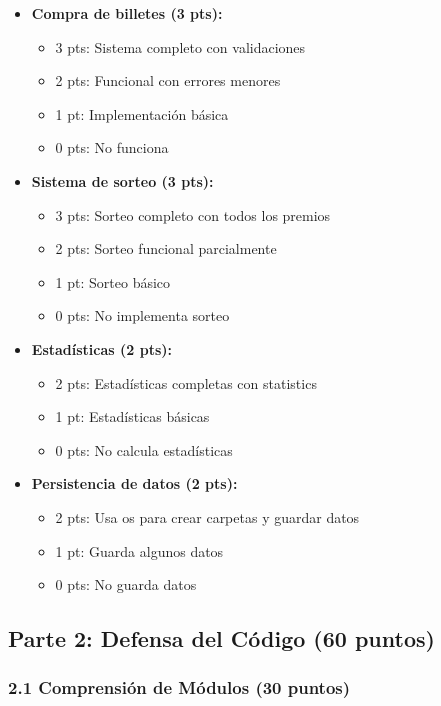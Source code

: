 \documentclass[12pt,a4paper]{article}
\begin{document}
\begin{itemize}[leftmargin=*]
    \item \textbf{Compra de billetes (3 pts):}
    \begin{itemize}
        \item 3 pts: Sistema completo con validaciones
        \item 2 pts: Funcional con errores menores
        \item 1 pt: Implementación básica
        \item 0 pts: No funciona
    \end{itemize}
    
    \item \textbf{Sistema de sorteo (3 pts):}
    \begin{itemize}
        \item 3 pts: Sorteo completo con todos los premios
        \item 2 pts: Sorteo funcional parcialmente
        \item 1 pt: Sorteo básico
        \item 0 pts: No implementa sorteo
    \end{itemize}
    
    \item \textbf{Estadísticas (2 pts):}
    \begin{itemize}
        \item 2 pts: Estadísticas completas con statistics
        \item 1 pt: Estadísticas básicas
        \item 0 pts: No calcula estadísticas
    \end{itemize}
    
    \item \textbf{Persistencia de datos (2 pts):}
    \begin{itemize}
        \item 2 pts: Usa os para crear carpetas y guardar datos
        \item 1 pt: Guarda algunos datos
        \item 0 pts: No guarda datos
    \end{itemize}
\end{itemize}

\subsection{Parte 2: Defensa del Código (60 puntos)}

\subsubsection{2.1 Comprensión de Módulos (30 puntos)}
\end{document}
